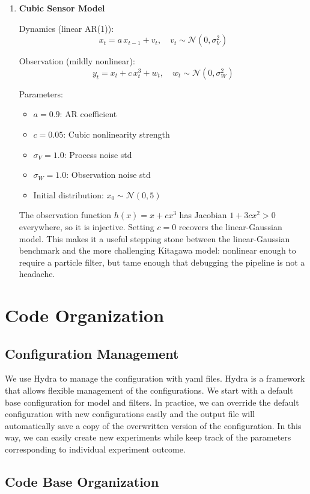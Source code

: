 \documentclass{article}
\begin{document}
\begin{enumerate}
\item \textbf{Cubic Sensor Model}

Dynamics (linear AR(1)):
\[ x_t = a \, x_{t-1} + v_t, \quad v_t \sim \mathcal{N}(0, \sigma_V^2) \]

Observation (mildly nonlinear):
\[ y_t = x_t + c \, x_t^3 + w_t, \quad w_t \sim \mathcal{N}(0, \sigma_W^2) \]

Parameters:
\begin{itemize}
\item $a = 0.9$: AR coefficient
\item $c = 0.05$: Cubic nonlinearity strength
\item $\sigma_V = 1.0$: Process noise std
\item $\sigma_W = 1.0$: Observation noise std
\item Initial distribution: $x_0 \sim \mathcal{N}(0, 5)$
\end{itemize}
The observation function $h(x) = x + cx^3$ has Jacobian $1 + 3cx^2 > 0$ everywhere, so it is injective. Setting $c = 0$ recovers the linear-Gaussian model. This makes it a useful stepping stone between the linear-Gaussian benchmark and the more challenging Kitagawa model: nonlinear enough to require a particle filter, but tame enough that debugging the pipeline is not a headache.

\end{enumerate}
\section{Code Organization}\label{app:code_org}


\subsection{Configuration Management}
We use Hydra to manage the configuration with yaml files. Hydra is a framework that allows flexible management of the configurations. We start with a default base configuration for model and filters. In practice, we can override the default configuration with new configurations easily and the output file will automatically save a copy of the overwritten version of the configuration. In this way, we can easily create new experiments while keep track of the parameters corresponding to individual experiment outcome.
\subsection{Code Base Organization}
\end{document}
